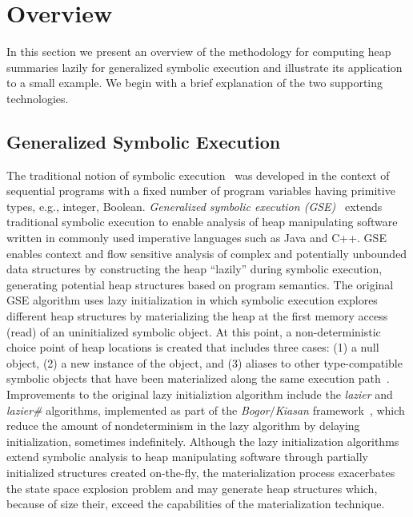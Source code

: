 \section{Overview}
\label{sec:overview}

In this section we present an overview of the methodology for
computing heap summaries lazily for generalized symbolic execution
and illustrate its application to a small example. We begin with
a brief explanation of the two supporting technologies.

\subsection{Generalized Symbolic Execution}

The traditional notion of symbolic 
execution~\cite{clarke76TSE,King:76} was developed in the
context of sequential programs with a fixed number of program
variables having primitive types, e.g., integer, Boolean.
\emph{Generalized symbolic execution (GSE)}~\cite{GSE03} extends
traditional symbolic execution to enable analysis of heap
manipulating software written in commonly used imperative
languages such as Java and C++. 
GSE enables context and flow sensitive analysis of complex
and potentially unbounded data structures by
constructing the heap ``lazily'' during symbolic execution,
generating potential heap structures based on program semantics.
The original GSE algorithm uses lazy initialization in which
symbolic execution explores different heap structures
by materializing the heap at the first memory access (read) of
an uninitialized symbolic object. At this point, a non-deterministic
choice point of heap locations is created that includes three cases:
(1) a null
object, (2) a new instance of the object, and (3) aliases
to other type-compatible symbolic objects that have been materialized
along the same execution path~\cite{GSE03}.  
Improvements to the original lazy initializtion algorithm include the 
\emph{lazier} and \emph{lazier\#} algorithms, implemented as part of the 
\emph{Bogor$/$Kiasan} framework~\cite{Kiasan06,Kiasan07}, which
reduce the amount of nondeterminism in the lazy algorithm by
delaying initialization, sometimes indefinitely. 
Although the lazy initialization algorithms extend symbolic
analysis to heap manipulating software through partially initialized
structures created on-the-fly, the materialization process
exacerbates the state space explosion problem and may generate
heap structures which, because of size their, exceed the capabilities
of the materialization technique.

